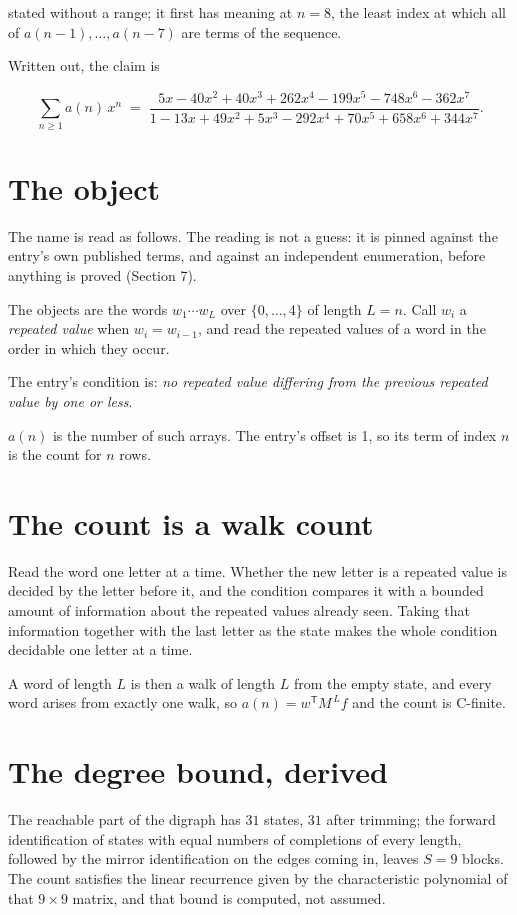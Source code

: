 \documentclass[11pt]{article}
\theoremstyle{definition}
\begin{document}
stated without a range; it first has meaning at $n = 8$, the least index at which all of $a(n-1),\dots,a(n-7)$ are terms of the sequence.

Written out, the claim is

\[\sum_{n \ge 1} a(n)\,x^n \;=\; \frac{5x - 40x^{2} + 40x^{3} + 262x^{4} - 199x^{5} - 748x^{6} - 362x^{7}}{1 - 13x + 49x^{2} + 5x^{3} - 292x^{4} + 70x^{5} + 658x^{6} + 344x^{7}}.\]

\section{The object}

The name is read as follows. The reading is not a guess: it is pinned against the entry's own published terms, and against an independent enumeration, before anything is proved (Section 7).

The objects are the words $w_1\cdots w_L$ over $\{0,\dots,4\}$ of length $L = n$. Call $w_i$ a {\itshape repeated value} when $w_i = w_{i-1}$, and read the repeated values of a word in the order in which they occur.

The entry's condition is: {\itshape no repeated value differing from the previous repeated value by one or less}.

$a(n)$ is the number of such arrays. The entry's offset is 1, so its term of index $n$ is the count for $n$ rows.

\section{The count is a walk count}

Read the word one letter at a time. Whether the new letter is a repeated value is decided by the letter before it, and the condition compares it with a bounded amount of information about the repeated values already seen. Taking that information together with the last letter as the state makes the whole condition decidable one letter at a time.

A word of length $L$ is then a walk of length $L$ from the empty state, and every word arises from exactly one walk, so $a(n) = w^{\mathsf T}M^{\,L}f$ and the count is C-finite.

\section{The degree bound, derived}

The reachable part of the digraph has $31$ states, $31$ after trimming; the forward identification of states with equal numbers of completions of every length, followed by the mirror identification on the edges coming in, leaves $S = 9$ blocks. The count satisfies the linear recurrence given by the characteristic polynomial of that $9\times9$ matrix, and that bound is computed, not assumed.
\end{document}
